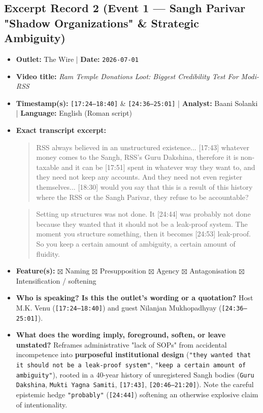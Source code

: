 \documentclass[10pt,a4paper]{article}
\begin{document}
\subsection*{Excerpt Record 2 (Event 1 --- Sangh Parivar "Shadow Organizations" \& Strategic Ambiguity)}
\begin{itemize}[leftmargin=1.5em, itemsep=3pt, topsep=4pt]
  \item \textbf{Outlet:} The Wire | \textbf{Date:} \texttt{2026-07-01}
  \item \textbf{Video title:} \textit{Ram Temple Donations Loot: Biggest Credibility Test For Modi-RSS}
  \item \textbf{Timestamp(s):} \texttt{[17:24--18:40]} \& \texttt{[24:36--25:01]} | \textbf{Analyst:} Baani Solanki | \textbf{Language:} English (Roman script)
  \item \textbf{Exact transcript excerpt:}
    \begin{quote}\small\ttfamily [17:24] [M.K. Venu:] RSS always believed in an unstructured existence... [17:43] whatever money comes to the Sangh, RSS's Guru Dakshina, therefore it is non-taxable and it can be [17:51] spent in whatever way they want to, and they need not keep any accounts. And they need not even register themselves... [18:30] would you say that this is a result of this history where the RSS or the Sangh Parivar, they refuse to be accountable?\end{quote}
    \begin{quote}\small{} Setting up structures was not done. It [24:44] was probably not done because they wanted that it should not be a leak-proof system. The moment you structure something, then it becomes [24:53] leak-proof. So you keep a certain amount of ambiguity, a certain amount of fluidity.\end{quote}
  \item \textbf{Feature(s):} $\boxtimes$ Naming $\boxtimes$ Presupposition $\boxtimes$ Agency $\boxtimes$ Antagonisation $\boxtimes$ Intensification / softening
  \item \textbf{Who is speaking? Is this the outlet's wording or a quotation?} Host M.K. Venu (\texttt{[17:24--18:40]}) and guest Nilanjan Mukhopadhyay (\texttt{[24:36--25:01]}).
  \item \textbf{What does the wording imply, foreground, soften, or leave unstated?} Reframes administrative "lack of SOPs" from accidental incompetence into \textbf{purposeful institutional design} (\texttt{"they wanted that it should not be a leak-proof system"}, \texttt{"keep a certain amount of ambiguity"}), rooted in a 40-year history of unregistered Sangh bodies (\texttt{Guru Dakshina}, \texttt{Mukti Yagna Samiti}, \texttt{[17:43]}, \texttt{[20:46--21:20]}). Note the careful epistemic hedge \texttt{"probably"} (\texttt{[24:44]}) softening an otherwise explosive claim of intentionality.

\end{itemize}
\end{document}

